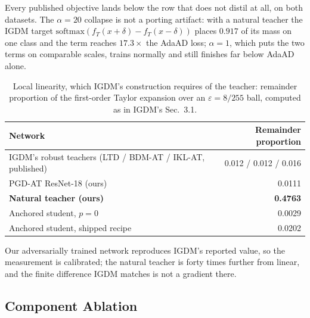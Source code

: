 Every published objective lands below the row that does not distil at all, on both datasets. The
$\alpha=20$ collapse is not a porting artifact: with a natural teacher the IGDM target
$\mathrm{softmax}(f_T(x{+}\delta)-f_T(x{-}\delta))$ places $0.917$ of its mass on one class and the
term reaches $17.3\times$ the AdaAD loss; $\alpha=1$, which puts the two terms on comparable scales,
trains normally and still finishes far below AdaAD alone.

\begin{table}[t]
  \centering
  \caption{Local linearity, which IGDM's construction requires of the teacher: remainder proportion of
  the first-order Taylor expansion over an $\varepsilon=8/255$ ball, computed as in IGDM's Sec.~3.1.}
  \label{tab:linearity}
  \begin{tabular}{lr}
    \toprule
    Network & Remainder proportion \\
    \midrule
    IGDM's robust teachers (LTD / BDM-AT / IKL-AT, published) & 0.012 / 0.012 / 0.016 \\
    PGD-AT ResNet-18 (ours)          & 0.0111 \\
    \textbf{Natural teacher (ours)}  & \textbf{0.4763} \\
    Anchored student, $p=0$          & 0.0029 \\
    Anchored student, shipped recipe & 0.0202 \\
    \bottomrule
  \end{tabular}
\end{table}

Our adversarially trained network reproduces IGDM's reported value, so the measurement is calibrated;
the natural teacher is forty times further from linear, and the finite difference IGDM matches is not
a gradient there.

\subsection{Component Ablation}
\label{sec:components}

